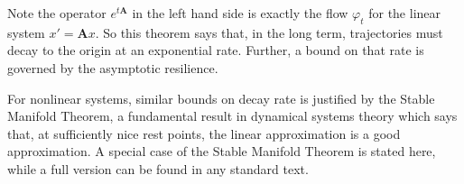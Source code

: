 %	

Note the operator $e^{t\mathbf{A}}$ in the left hand side is exactly the flow $\varphi_t$ for the linear system $x' = \mathbf{A}x$. So this theorem says that, in the long term, trajectories must decay to the origin at an exponential rate. Further, a bound on that rate is governed by the asymptotic resilience. 

%



For nonlinear systems, similar bounds on decay rate is justified by the Stable Manifold Theorem, a fundamental result in dynamical systems theory which says that, at sufficiently nice rest points, the linear approximation is a good approximation. %
%
%
%
A special case of the Stable Manifold Theorem is stated here, while a full version can be found in any standard text. %

